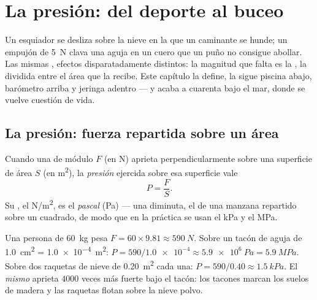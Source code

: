 \chapter{La presión: del deporte al buceo}\label{ch:g10:pressure}

Un esquiador se desliza sobre la nieve en la que un caminante se hunde;
un empujón de \qty{5}{N} clava una aguja en un cuero que un puño no
consigue abollar. Las mismas , efectos disparatadamente
distintos: la magnitud que falta es la \emph{}, la 
dividida entre el área que la recibe. Este capítulo la define, la sigue
piscina abajo, barómetro arriba y jeringa adentro --- y acaba a cuarenta
 bajo el mar, donde se vuelve cuestión de vida.

\section{La presión: fuerza repartida sobre un área}

\begin{definition}[Presión]\label{def:g10:pressure:pressure}
Cuando una  de módulo $F$ (en \unit{N}) aprieta
perpendicularmente sobre una superficie de área $S$ (en \unit{m^2}), la
\emph{presión} ejercida sobre esa superficie vale
\[
P = \frac{F}{S}.
\]
Su , el \unit{N/m^2}, es el \emph{pascal}
(\unit{Pa}) --- una  diminuta, el  de una manzana repartido
sobre un  cuadrado, de modo que en la práctica se usan el
\unit{kPa} y el \unit{MPa}.
\end{definition}

\begin{example}\label{ex:g10:pressure:snowshoe}
Una persona de \qty{60}{kg} pesa
$F = 60 \times 9.81 \approx \qty{590}{N}$. Sobre un tacón de aguja de
\qty{1.0}{cm^2} = \qty{1.0e-4}{m^2}:
$P = 590/\num{1.0e-4} \approx \qty{5.9e6}{Pa} = \qty{5.9}{MPa}$. Sobre
dos raquetas de nieve de \qty{0.20}{m^2} cada una:
$P = 590/0.40 \approx \qty{1.5}{kPa}$. El \emph{mismo}  aprieta
$4000$ veces más fuerte bajo el tacón: los tacones marcan los suelos de
madera y las raquetas flotan sobre la nieve polvo.
\end{example}

